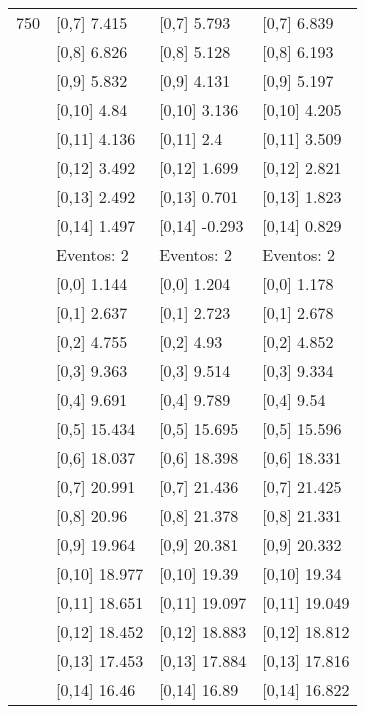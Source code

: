 \begin{table}
\begin{tabular}[t]{llll}
750 & {}[0,7] 7.415 & {}[0,7] 5.793 & {}[0,7] 6.839\\
\addlinespace
 & {}[0,8] 6.826 & {}[0,8] 5.128 & {}[0,8] 6.193\\
 & {}[0,9] 5.832 & {}[0,9] 4.131 & {}[0,9] 5.197\\
 & {}[0,10] 4.84 & {}[0,10] 3.136 & {}[0,10] 4.205\\
 & {}[0,11] 4.136 & {}[0,11] 2.4 & {}[0,11] 3.509\\
 & {}[0,12] 3.492 & {}[0,12] 1.699 & {}[0,12] 2.821\\
\addlinespace
 & {}[0,13] 2.492 & {}[0,13] 0.701 & {}[0,13] 1.823\\
 & {}[0,14] 1.497 & {}[0,14] -0.293 & {}[0,14] 0.829\\
 & Eventos:  2 & Eventos:  2 & Eventos:  2\\
 & {}[0,0] 1.144 & {}[0,0] 1.204 & {}[0,0] 1.178\\
 & {}[0,1] 2.637 & {}[0,1] 2.723 & {}[0,1] 2.678\\
\addlinespace
 & {}[0,2] 4.755 & {}[0,2] 4.93 & {}[0,2] 4.852\\
 & {}[0,3] 9.363 & {}[0,3] 9.514 & {}[0,3] 9.334\\
 & {}[0,4] 9.691 & {}[0,4] 9.789 & {}[0,4] 9.54\\
 & {}[0,5] 15.434 & {}[0,5] 15.695 & {}[0,5] 15.596\\
 & {}[0,6] 18.037 & {}[0,6] 18.398 & {}[0,6] 18.331\\
\addlinespace
1000 & {}[0,7] 20.991 & {}[0,7] 21.436 & {}[0,7] 21.425\\
 & {}[0,8] 20.96 & {}[0,8] 21.378 & {}[0,8] 21.331\\
 & {}[0,9] 19.964 & {}[0,9] 20.381 & {}[0,9] 20.332\\
 & {}[0,10] 18.977 & {}[0,10] 19.39 & {}[0,10] 19.34\\
 & {}[0,11] 18.651 & {}[0,11] 19.097 & {}[0,11] 19.049\\
\addlinespace
 & {}[0,12] 18.452 & {}[0,12] 18.883 & {}[0,12] 18.812\\
 & {}[0,13] 17.453 & {}[0,13] 17.884 & {}[0,13] 17.816\\
 & {}[0,14] 16.46 & {}[0,14] 16.89 & {}[0,14] 16.822\\
\bottomrule
\end{tabular}
\end{table}
